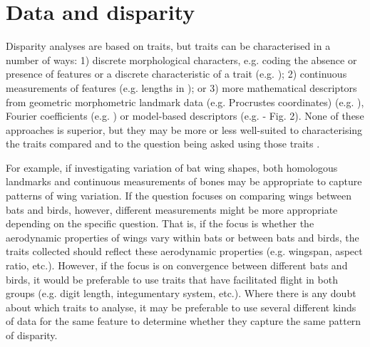 \documentclass[12pt,letterpaper]{article}
\begin{document}



\section{Data and disparity} \label{section:data}


\noindent Disparity analyses are based on traits, but traits can be characterised in a number of ways:
1) discrete morphological characters, e.g. coding the absence or presence of features or a discrete characteristic of a trait (e.g. \citealt{Foote1989, Deline2018});
2) continuous measurements of features (e.g. lengths in \citealt{Friedman2010});
or 3) more mathematical descriptors from geometric morphometric landmark data (e.g.
Procrustes coordinates)  (e.g. \citealt{sherratt2017rates}), Fourier coefficients (e.g. \citealt{Foote1995, Spriggs2018}) or model-based descriptors (e.g. \citealt{Raup1961,Saunders2004} - Fig. 2).
None of these approaches is superior, but they may be more or less well-suited to characterising the traits compared and to the question being asked using those traits \citep{hetherington2015cladistic,Hopkins2017}.

For example, if investigating variation of bat wing shapes, both homologous landmarks and continuous measurements of bones may be appropriate to capture patterns of wing variation.
If the question focuses on comparing wings between bats and birds, however, different measurements might be more appropriate depending on the specific question.
That is, if the focus is whether the aerodynamic properties of wings vary within bats or between bats and birds, the traits collected should reflect these aerodynamic properties (e.g. wingspan, aspect ratio, etc.).
However, if the focus is on convergence between different bats and birds, it would be preferable to use traits that have facilitated flight in both groups (e.g.
digit length, integumentary system, etc.).
Where there is any doubt about which traits to analyse, it may be preferable to use several different kinds of data for the same feature to determine whether they capture the same pattern of disparity.
\end{document}
